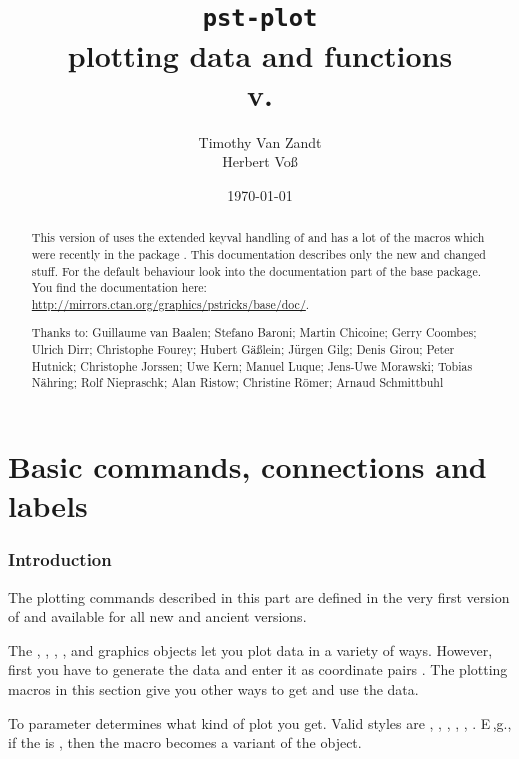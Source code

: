 \documentclass[11pt,english,BCOR10mm,DIV12,bibliography=totoc,parskip=false,smallheadings
    headexclude,footexclude,oneside,dvipsnames,svgnames]{pst-doc}
\let\pstFV\fileversion
\begin{document}
\title{\texttt{pst-plot}\\plotting data and functions \\\small v.\pstFV}
\author{Timothy Van Zandt\\Herbert Vo\ss}
\date{\today}

\maketitle

\begin{abstract}
This version of  uses the extended keyval handling
of  and has a lot of the macros which were recently in
the package . This documentation describes only the
new and changed stuff. For the default behaviour look into the
documentation part of the base  package. You find the
documentation here: \url{http://mirrors.ctan.org/graphics/pstricks/base/doc/}.

\vfill
\noindent
Thanks to:  
Guillaume van Baalen;
Stefano Baroni;
Martin Chicoine;
Gerry Coombes;
Ulrich Dirr;
Christophe Fourey;
Hubert G\"a\ss lein;
J\"urgen Gilg;
Denis Girou;
Peter Hutnick;
Christophe Jorssen;
Uwe Kern;
Manuel Luque;
Jens-Uwe Morawski;
Tobias N\"ahring;
Rolf Niepraschk;
Alan Ristow;
Christine R\"omer;
Arnaud Schmittbuhl
\end{abstract}

\clearpage
\tableofcontents

\clearpage
\part{Basic commands, connections and labels}
\section{Introduction}
The plotting commands described in this part are defined in the very first version
of  and available for all new and ancient versions.

The , , , ,  and
 graphics objects let you plot data in a variety of ways. However,
first you have to generate the data and enter it as coordinate pairs \CAny.
The plotting macros in this section give you other ways to get and use the
data. %

To parameter
determines what kind of plot you get. Valid styles are , ,
, , , . E\,,g., if the  is
, then the macro becomes a variant of the  object.
\end{document}
